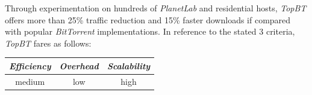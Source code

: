 Through experimentation on hundreds of {\it PlanetLab} and residential hosts,
\emph{TopBT} offers more than 25\% traffic reduction and 15\% faster downloads
if compared with popular {\sl BitTorrent} implementations.
%
In reference to the stated $3$ criteria, \emph{TopBT} fares as follows:
\begin{center}
{\footnotesize
\begin{tabular}{ccc}
\emph{Efficiency} & \emph{Overhead} & \emph{Scalability} \\
\hline
medium &
low &
high
\end{tabular}
}
\end{center}

